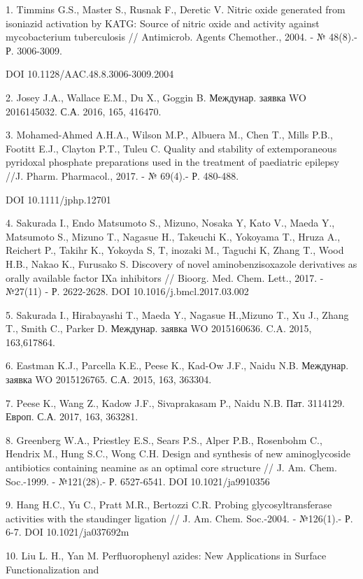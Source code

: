 \begin{noparindent}
1. Timmins G.S., Master S., Rusnak F., Deretic V. Nitric oxide generated
from isoniazid activation by KATG: Source of nitric oxide and activity
against mycobacterium tuberculosis // Antimicrob. Agents Chemother.,
2004. - № 48(8).- Р. 3006-3009.

DOI 10.1128/AAC.48.8.3006-3009.2004

2. Josey J.A., Wallace E.M., Du X., Goggin B. Междунар. заявка WO
2016145032. С.А. 2016, 165, 416470.

3. Mohamed-Ahmed A.H.A., Wilson M.P., Albuera M., Chen T., Mills P.B.,
Footitt E.J., Clayton P.T., Tuleu C. Quality and stability of
extemporaneous pyridoxal phosphate preparations used in the treatment of
paediatric epilepsy //J. Pharm. Pharmacol., 2017. - № 69(4).- Р.
480-488.

DOI 10.1111/jphp.12701

4. Sakurada I., Endo Matsumoto S., Mizuno, Nosaka Y, Kato V., Maeda Y.,
Matsumoto S., Mizuno T., Nagasue H., Takeuchi K., Yokoyama T., Hruza A.,
Reichert P., Takihr K., Yokoyda S, T, inozaki M., Taguchi K, Zhang T.,
Wood H.B., Nakao K., Furusako S. Discovery of novel aminobenzisoxazole
derivatives as orally available factor IXa inhibitors // Bioorg. Med.
Chem. Lett., 2017. - №27(11) - Р. 2622-2628. DOI
10.1016/j.bmcl.2017.03.002

5. Sakurada I., Hirabayashi T., Maeda Y., Nagasue H.,Mizuno T., Xu J.,
Zhang T., Smith C., Parker D. Междунар. заявка WO 2015160636. C.A. 2015,
163,617864.

6. Eastman K.J., Parcella K.E., Peese K., Kad-Ow J.F., Naidu N.B.
Междунар. заявка WO 2015126765. С.А. 2015, 163, 363304.

7. Peese K., Wang Z., Kadow J.F., Sivaprakasam P., Naidu N.B. Пат.
3114129. Европ. С.А. 2017, 163, 363281.

8. Greenberg W.A., Priestley E.S., Sears P.S., Alper P.B., Rosenbohm C.,
Hendrix M., Hung S.C., Wong C.H. Design and synthesis of new
aminoglycoside antibiotics containing neamine as an optimal core
structure // J. Am. Chem. Soc.-1999. - №121(28).- Р. 6527-6541. DOI
10.1021/ja9910356

9. Hang H.C., Yu C., Pratt M.R., Bertozzi C.R. Probing
glycosyltransferase activities with the staudinger ligation // J. Am.
Chem. Soc.-2004. - №126(1).- Р. 6-7. DOI 10.1021/ja037692m

10. Liu L. H., Yan M. Perfluorophenyl azides: New Applications in
Surface Functionalization and


\end{noparindent}
